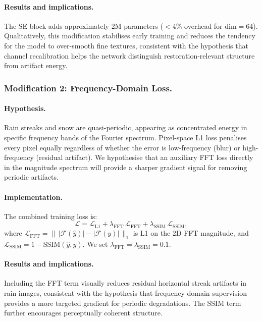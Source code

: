 \documentclass[runningheads]{llncs}
\begin{document}
\paragraph{Results and implications.}
The SE block adds approximately 2M parameters ($<$4\% overhead for dim$=64$).
Qualitatively, this modification stabilises early training and reduces the
tendency for the model to over-smooth fine textures, consistent with the
hypothesis that channel recalibration helps the network distinguish
restoration-relevant structure from artifact energy.

\subsubsection{Modification 2: Frequency-Domain Loss.}

\paragraph{Hypothesis.}
Rain streaks and snow are quasi-periodic, appearing as concentrated energy
in specific frequency bands of the Fourier spectrum. Pixel-space L1 loss
penalises every pixel equally regardless of whether the error is
low-frequency (blur) or high-frequency (residual artifact). We hypothesise
that an auxiliary FFT loss directly in the magnitude spectrum will provide
a sharper gradient signal for removing periodic artifacts.

\paragraph{Implementation.}
The combined training loss is:
\begin{equation}
  \mathcal{L} = \mathcal{L}_{\text{L1}} + \lambda_{\text{FFT}}\,\mathcal{L}_{\text{FFT}} + \lambda_{\text{SSIM}}\,\mathcal{L}_{\text{SSIM}},
\end{equation}
where $\mathcal{L}_{\text{FFT}} = \|\,|\mathcal{F}(\hat{y})| - |\mathcal{F}(y)|\,\|_1$
is L1 on the 2D FFT magnitude, and $\mathcal{L}_{\text{SSIM}} = 1 - \text{SSIM}(\hat{y}, y)$.
We set $\lambda_{\text{FFT}} = \lambda_{\text{SSIM}} = 0.1$.

\paragraph{Results and implications.}
Including the FFT term visually reduces residual horizontal streak artifacts in
rain images, consistent with the hypothesis that frequency-domain supervision
provides a more targeted gradient for periodic degradations. The SSIM term
further encourages perceptually coherent structure.
\end{document}
